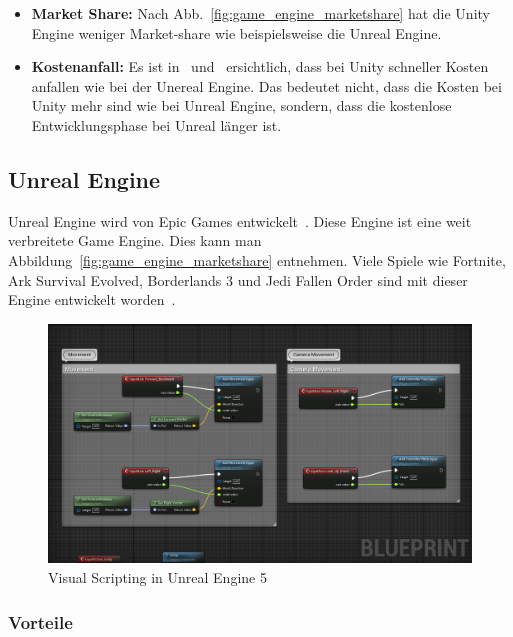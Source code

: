 \begin{itemize}
    \item \textbf{Market Share:} Nach Abb.~\ref{fig:game_engine_marketshare} hat die Unity Engine weniger Market-share wie beispielsweise die Unreal Engine.
    \item \textbf{Kostenanfall:} Es ist in~\cite{UNREAL_ENGINE_PRICING_2022} und~\cite{Unity_Pricing_2} ersichtlich, dass bei Unity schneller Kosten anfallen wie bei der Unereal Engine.
    Das bedeutet nicht, dass die Kosten bei Unity mehr sind wie bei Unreal Engine, sondern, dass die kostenlose Entwicklungsphase bei Unreal länger ist.
\end{itemize}

\subsection{Unreal Engine}
\label{subsec:unreal_engine}

Unreal Engine wird von Epic Games entwickelt~\cite{UNEAL_ENGINE_OWNER_2022}.
Diese Engine ist eine weit verbreitete Game Engine.
Dies kann man Abbildung~\ref{fig:game_engine_marketshare} entnehmen.
Viele Spiele wie Fortnite, Ark Survival Evolved, Borderlands 3 und Jedi Fallen Order sind mit dieser Engine entwickelt worden~\cite{WIKIPEDIA_UNREAL_GAME_LIST}.

\begin{figure}
    \centering
    \includegraphics[scale=0.3]{pics/visual_scripting_unreal_engine}
    \caption{Visual Scripting in Unreal Engine 5}
    \label{fig:visual_scripting_unreal_engine}
\end{figure}

\subsubsection{Vorteile}

